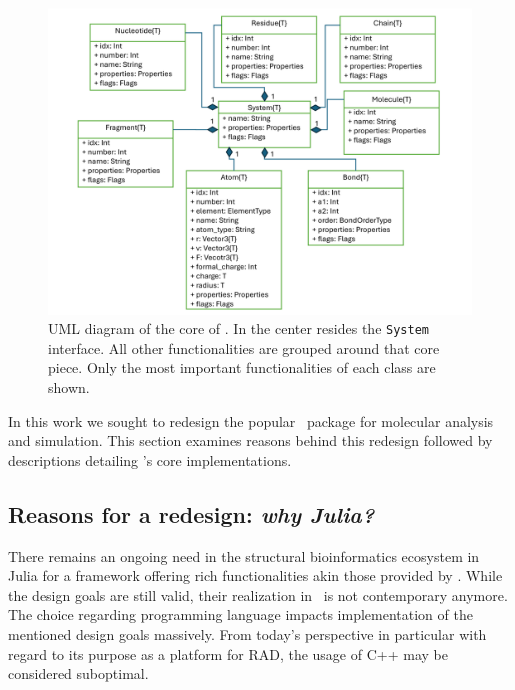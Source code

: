 
\section{\biochem}
\label{sec:juliaball}


\begin{figure}[t]
	\centerline{\includegraphics[width=15cm]{gfx/uml.png}}
	\caption{UML diagram of the core of \biochem. In the center resides the \texttt{System} interface. All other functionalities are grouped around that core piece. Only the most important functionalities of each class are  shown.}
	\label{fig:biochem_uml}
\end{figure}



In this work we sought to redesign the popular \ball\ package for molecular analysis and simulation. This section examines reasons behind this redesign followed by descriptions detailing \biochem's core implementations.

\subsection{Reasons for a redesign: \textit{why Julia?}}

There remains an ongoing need in the structural bioinformatics ecosystem in Julia for a framework offering rich functionalities akin those provided by \ball.  While the design goals are still valid, their realization in \ball\ is not contemporary anymore. The choice regarding programming language impacts implementation of the mentioned design goals massively. From today's perspective in particular with regard to its purpose as a platform for RAD, the usage of C++ may be considered suboptimal. \\

